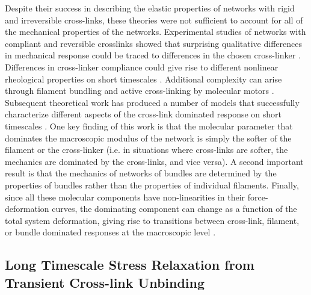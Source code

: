 Despite their success in describing \cite{theo_best} the elastic properties of networks with rigid and irreversible cross-links, these theories were not sufficient to account for all of the mechanical properties of the networks. Experimental studies of networks with compliant and reversible crosslinks showed that surprising qualitative differences in mechanical response could be traced to differences in the chosen cross-linker \cite{rheo_crosslinkcompare,rheo_crosslinkreview}.  Differences in cross-linker compliance could give rise to different nonlinear rheological properties on short timescales \cite{rheo_crosslink_nonlin1,rheo_crosslink_nonlin2,rheo_crosslink_nonlin3,rheo_crosslink_notactin}. Additional complexity can arise through filament bundling \cite{theo_crosslinkslip2,model_massive}and active cross-linking by molecular motors \cite{rheo_active}. Subsequent theoretical work has produced a number of models that successfully characterize different aspects of the cross-link dominated response on short timescales \cite{theo_nonaffine2,theo_floppy,theo_crosslinknonlinear}.  One key finding of this work is that the molecular parameter that dominates the macroscopic modulus of the network is simply the softer of the filament or the cross-linker (i.e. in situations where cross-links are softer, the mechanics are dominated by the cross-links, and vice versa).  A second important result is that the mechanics of networks of bundles are determined by the properties of bundles rather than the properties of individual filaments.  Finally, since all these molecular components have non-linearities in their force-deformation curves, the dominating component can change as a function of the total system deformation, giving rise to transitions between cross-link, filament, or bundle dominated responses at the macroscopic level \cite{megareview}.  

\subsection{Long Timescale Stress Relaxation from Transient Cross-link Unbinding}

